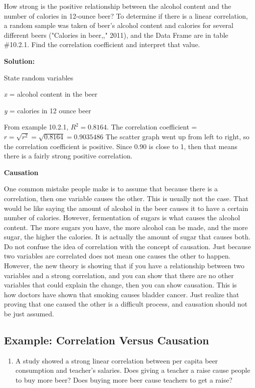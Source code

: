 \documentclass[
]{book}
\providecommand{\tightlist}{%
  \setlength{\itemsep}{0pt}\setlength{\parskip}{0pt}}
\begin{document}
How strong is the positive relationship between the alcohol content and the number of calories in 12-ounce beer? To determine if there is a linear correlation, a random sample was taken of beer's alcohol content and calories for several different beers ("Calories in beer,," 2011), and the Data Frame are in table \#10.2.1. Find the correlation coefficient and interpret that value.

\textbf{Solution:}

State random variables

\emph{x} = alcohol content in the beer

\emph{y} = calories in 12 ounce beer

From example 10.2.1, \(R^2=0.8164\). The correlation coefficient = \(r=\sqrt{r^2}=\sqrt{0.8164}=0.9035486\) The scatter graph went up from left to right, so the correlation coefficient is positive. Since 0.90 is close to 1, then that means there is a fairly strong positive correlation.

\textbf{Causation}

One common mistake people make is to assume that because there is a correlation, then one variable causes the other. This is usually not the case. That would be like saying the amount of alcohol in the beer causes it to have a certain number of calories. However, fermentation of sugars is what causes the alcohol content. The more sugars you have, the more alcohol can be made, and the more sugar, the higher the calories. It is actually the amount of sugar that causes both. Do not confuse the idea of correlation with the concept of causation. Just because two variables are correlated does not mean one causes the other to happen. However, the new theory is showing that if you have a relationship between two variables and a strong correlation, and you can show that there are no other variables that could explain the change, then you can show causation. This is how doctors have shown that smoking causes bladder cancer. Just realize that proving that one caused the other is a difficult process, and causation should not be just assumed.

\hypertarget{example-correlation-versus-causation}{%
\subsection{Example: Correlation Versus Causation}\label{example-correlation-versus-causation}}

\begin{enumerate}
\def\labelenumi{\alph{enumi}.}
\tightlist
\item
  A study showed a strong linear correlation between per capita beer consumption and teacher's salaries. Does giving a teacher a raise cause people to buy more beer? Does buying more beer cause teachers to get a raise?
\end{enumerate}
\end{document}
